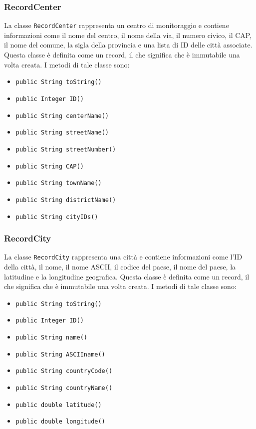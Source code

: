 \subsubsection{RecordCenter}
La classe \texttt{RecordCenter} rappresenta un centro di monitoraggio e contiene informazioni come il nome del centro, il nome della via, il numero civico, il CAP, il nome del comune, la sigla della provincia e una lista di ID delle città associate.
Questa classe è definita come un record, il che significa che è immutabile una volta creata.
I metodi di tale classe sono:
\begin{itemize}
\item \texttt{public String toString()}
\item \texttt{public Integer ID()}
\item \texttt{public String centerName()}
\item \texttt{public String streetName()}
\item \texttt{public String streetNumber()}
\item \texttt{public String CAP()}
\item \texttt{public String townName()}
\item \texttt{public String districtName()}
\item \texttt{public String cityIDs()}
\end{itemize}

\subsubsection{RecordCity}
La classe \texttt{RecordCity} rappresenta una città e contiene informazioni come l'ID della città, il nome, il nome ASCII, il codice del paese, il nome del paese, la latitudine e la longitudine geografica.
Questa classe è definita come un record, il che significa che è immutabile una volta creata.
I metodi di tale classe sono:
\begin{itemize}
\item \texttt{public String toString()}
\item \texttt{public Integer ID()}
\item \texttt{public String name()}
\item \texttt{public String ASCIIname()}
\item \texttt{public String countryCode()}
\item \texttt{public String countryName()}
\item \texttt{public double latitude()}
\item \texttt{public double longitude()}
\end{itemize}

